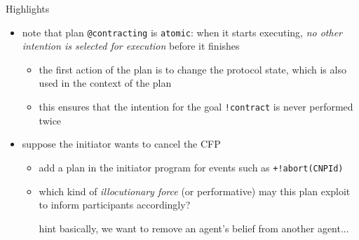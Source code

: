 \documentclass[presentation]{beamer}\mode<presentation>{\usetheme{AMSBolognaFC}}
\begin{document}
\begin{frame}[c]{Highlights}
    \begin{itemize}
        \item note that plan \texttt{@contracting} is \texttt{atomic}: when it starts executing, \emph{no other intention is selected for execution} before it finishes
        \begin{itemize}
            \item the first action of the plan is to change the protocol state, which is also used in the context of the plan
            \item this ensures that the intention for the goal \texttt{!contract} is never performed twice
        \end{itemize}
        
        \vfill
        
        \item suppose the initiator wants to cancel the CFP
        \begin{itemize}
            \item add a plan in the initiator program for events such as \texttt{+!abort(CNPId)}
            \item which kind of \emph{illocutionary force} (or performative) may this plan exploit to inform participants accordingly?
            \item[hint] basically, we want to remove an agent's belief from another agent...
        \end{itemize}

    \end{itemize}
\end{frame} 

\section*{}

\frame{\titlepage}

\section*{\refname}

\begin{frame}[c,noframenumbering]{\refname}
    \scriptsize
    
    
\end{frame}

\end{document}
